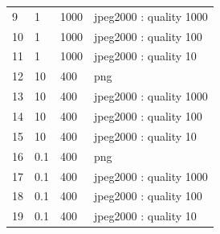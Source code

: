 \begin{table}[htpb]
\begin{tabular}{l|lll}
9       & 1                                                                                                        & 1000                                                                                         & jpeg2000 : quality 1000 \\
10      & 1                                                                                                        & 1000                                                                                         & jpeg2000 : quality 100  \\
11      & 1                                                                                                        & 1000                                                                                         & jpeg2000 : quality 10   \\
12      & 10                                                                                                       & 400                                                                                          & png                     \\
13      & 10                                                                                                       & 400                                                                                          & jpeg2000 : quality 1000 \\
14      & 10                                                                                                       & 400                                                                                          & jpeg2000 : quality 100  \\
15      & 10                                                                                                       & 400                                                                                          & jpeg2000 : quality 10   \\
16      & 0.1                                                                                                      & 400                                                                                          & png                     \\
17      & 0.1                                                                                                      & 400                                                                                          & jpeg2000 : quality 1000 \\
18      & 0.1                                                                                                      & 400                                                                                          & jpeg2000 : quality 100  \\
19      & 0.1                                                                                                      & 400                                                                                          & jpeg2000 : quality 10  
\end{tabular}
\end{table}

